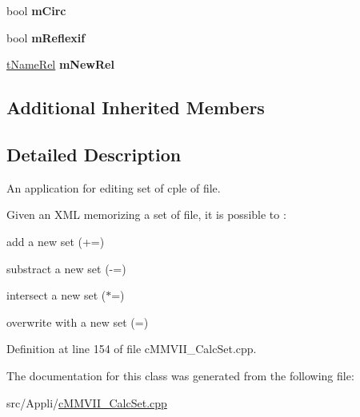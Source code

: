 \begin{DoxyCompactItemize}
\item 
bool {\bfseries m\+Circ}\hypertarget{classMMVII_1_1cAppli__EditRel_ae877975bb09c3b0264957d2d7935802c}{}\label{classMMVII_1_1cAppli__EditRel_ae877975bb09c3b0264957d2d7935802c}

\item 
bool {\bfseries m\+Reflexif}\hypertarget{classMMVII_1_1cAppli__EditRel_a489b1b1ed76493012a960109bd4aa7ab}{}\label{classMMVII_1_1cAppli__EditRel_a489b1b1ed76493012a960109bd4aa7ab}

\item 
\hyperlink{classMMVII_1_1cExtSet}{t\+Name\+Rel} {\bfseries m\+New\+Rel}\hypertarget{classMMVII_1_1cAppli__EditRel_ad9a3c511ae44d04b2102e1e770a295d6}{}\label{classMMVII_1_1cAppli__EditRel_ad9a3c511ae44d04b2102e1e770a295d6}

\end{DoxyCompactItemize}
\subsection*{Additional Inherited Members}


\subsection{Detailed Description}
An application for editing set of cple of file. 

Given an X\+ML memorizing a set of file, it is possible to \+:


\begin{DoxyItemize}
\item add a new set (+=)
\item substract a new set (-\/=)
\item intersect a new set ($\ast$=)
\item overwrite with a new set (=) 
\end{DoxyItemize}

Definition at line 154 of file c\+M\+M\+V\+I\+I\+\_\+\+Calc\+Set.\+cpp.



The documentation for this class was generated from the following file\+:\begin{DoxyCompactItemize}
\item 
src/\+Appli/\hyperlink{cMMVII__CalcSet_8cpp}{c\+M\+M\+V\+I\+I\+\_\+\+Calc\+Set.\+cpp}\end{DoxyCompactItemize}

